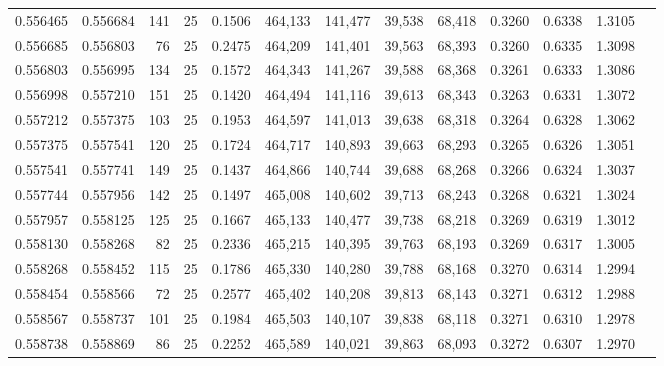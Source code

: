 \begin{tabular}{rrrrrrrrrrrrr}
0.556465 & 0.556684 &   141 &  25 &                                     0.1506 & 464,133 & 141,477 &  39,538 &  68,418 & 0.3260 & 0.6338 & 1.3105 \\
0.556685 & 0.556803 &    76 &  25 &                                     0.2475 & 464,209 & 141,401 &  39,563 &  68,393 & 0.3260 & 0.6335 & 1.3098 \\
0.556803 & 0.556995 &   134 &  25 &                                     0.1572 & 464,343 & 141,267 &  39,588 &  68,368 & 0.3261 & 0.6333 & 1.3086 \\
0.556998 & 0.557210 &   151 &  25 &                                     0.1420 & 464,494 & 141,116 &  39,613 &  68,343 & 0.3263 & 0.6331 & 1.3072 \\
0.557212 & 0.557375 &   103 &  25 &                                     0.1953 & 464,597 & 141,013 &  39,638 &  68,318 & 0.3264 & 0.6328 & 1.3062 \\
0.557375 & 0.557541 &   120 &  25 &                                     0.1724 & 464,717 & 140,893 &  39,663 &  68,293 & 0.3265 & 0.6326 & 1.3051 \\
0.557541 & 0.557741 &   149 &  25 &                                     0.1437 & 464,866 & 140,744 &  39,688 &  68,268 & 0.3266 & 0.6324 & 1.3037 \\
0.557744 & 0.557956 &   142 &  25 &                                     0.1497 & 465,008 & 140,602 &  39,713 &  68,243 & 0.3268 & 0.6321 & 1.3024 \\
0.557957 & 0.558125 &   125 &  25 &                                     0.1667 & 465,133 & 140,477 &  39,738 &  68,218 & 0.3269 & 0.6319 & 1.3012 \\
0.558130 & 0.558268 &    82 &  25 &                                     0.2336 & 465,215 & 140,395 &  39,763 &  68,193 & 0.3269 & 0.6317 & 1.3005 \\
0.558268 & 0.558452 &   115 &  25 &                                     0.1786 & 465,330 & 140,280 &  39,788 &  68,168 & 0.3270 & 0.6314 & 1.2994 \\
0.558454 & 0.558566 &    72 &  25 &                                     0.2577 & 465,402 & 140,208 &  39,813 &  68,143 & 0.3271 & 0.6312 & 1.2988 \\
0.558567 & 0.558737 &   101 &  25 &                                     0.1984 & 465,503 & 140,107 &  39,838 &  68,118 & 0.3271 & 0.6310 & 1.2978 \\
0.558738 & 0.558869 &    86 &  25 &                                     0.2252 & 465,589 & 140,021 &  39,863 &  68,093 & 0.3272 & 0.6307 & 1.2970 \\

\end{tabular}

